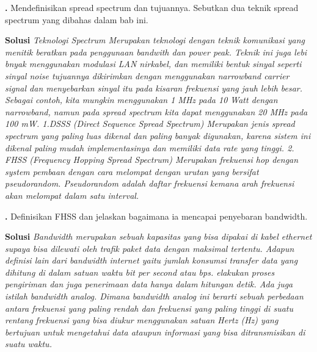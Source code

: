 \documentclass[oneside]{book}
\newcommand{\exercisename}{Latihan}
\newcommand{\solutionname}{Solusi}
\newcounter{exer}[chapter]
\renewcommand{\theexer}{\thechapter.\arabic{exer}}
\newenvironment{exercise}[1][]{
  \refstepcounter{exer}
  \par\noindent\textbf{\color{main}{\exercisename} \theexer #1 }\rmfamily}{
  \par\ignorespacesafterend}
\newenvironment{solution}{\par\noindent\textbf{\color{main}\solutionname} \em}{\par}
\begin{document}
\vspace{12pt}

\begin{exercise}
  Mendefinisikan spread spectrum dan tujuannya. Sebutkan dua teknik spread spectrum yang dibahas dalam bab ini.
\end{exercise}

\begin{solution}
  Teknologi Spectrum Merupakan teknologi dengan teknik komunikasi yang menitik beratkan pada penggunaan bandwith dan power peak. Teknik ini juga lebi bnyak menggunakan modulasi LAN nirkabel, dan memiliki bentuk sinyal seperti sinyal noise tujuannya dikirimkan dengan menggunakan narrowband carrier signal dan menyebarkan sinyal itu pada kisaran frekuensi yang jauh lebih besar. Sebagai contoh, kita mungkin menggunakan 1 MHz pada 10 Watt dengan narrowband, namun pada spread spectrum kita dapat menggunakan 20 MHz pada 100 mW.
  1.DSSS (Direct Sequence Spread Spectrum)
  Merupakan jenis spread spectrum yang paling luas dikenal dan paling banyak digunakan, karena sistem ini dikenal paling mudah implementasinya dan memiliki data rate yang tinggi.
  2. FHSS (Frequency Hopping Spread Spectrum)
  Merupakan frekuensi hop dengan system pembaan dengan cara melompat dengan urutan yang bersifat pseudorandom. Pseudorandom adalah daftar frekuensi kemana arah frekuensi akan melompat dalam satu interval.
\end{solution}

\vspace{12pt}

\begin{exercise}
  Definisikan FHSS dan jelaskan bagaimana ia mencapai penyebaran bandwidth.
\end{exercise}

\begin{solution}
  Bandwidth merupakan sebuah kapasitas yang bisa dipakai di kabel ethernet supaya bisa dilewati oleh trafik paket data dengan maksimal tertentu. Adapun definisi lain dari bandwidth internet yaitu jumlah konsumsi transfer data yang dihitung di dalam satuan waktu bit per second atau bps. elakukan proses pengiriman dan juga penerimaan data hanya dalam hitungan detik. Ada juga istilah bandwidth analog. Dimana bandwidth analog ini berarti sebuah perbedaan antara frekuensi yang paling rendah dan frekuensi yang paling tinggi di suatu rentang frekuensi yang bisa diukur menggunakan satuan Hertz (Hz) yang bertujuan untuk mengetahui data ataupun informasi yang bisa ditransmisikan di suatu waktu.
\end{solution}
\end{document}
